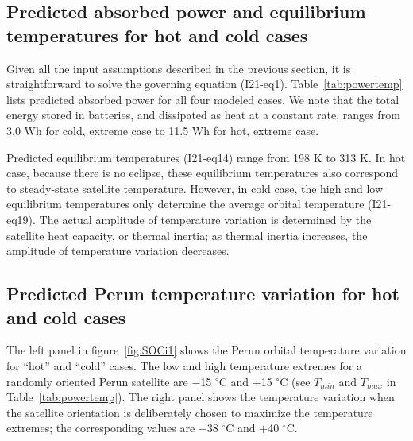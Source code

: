 \documentclass[]{aastex62}
\begin{document}
 


\subsection{Predicted absorbed power and equilibrium temperatures for hot and cold cases} 


Given all the input assumptions described in the previous section, it is straightforward to solve the
governing equation (I21-eq1). Table~\ref{tab:powertemp} lists predicted 
absorbed power for all four modeled cases.  We note that the total energy stored in batteries, and 
dissipated as heat at a constant rate, ranges from 3.0 Wh for cold, extreme case to 11.5 Wh for hot, extreme
case. 

Predicted equilibrium temperatures (I21-eq14) range from 198 K to 313 K. In hot case, because there
is no eclipse, these equilibrium temperatures also correspond to steady-state satellite temperature.
However, in cold case, the high and low equilibrium temperatures only determine the average orbital
temperature (I21-eq19). The actual amplitude of temperature variation is determined by the satellite
heat capacity, or thermal inertia; as thermal inertia increases, the amplitude of temperature variation 
decreases. 

 
\subsection{Predicted Perun temperature variation for hot and cold cases} 


The left panel in figure~\ref{fig:SOCi1} shows the Perun orbital temperature variation  for ``hot''
and ``cold'' cases. The low and high temperature extremes for a randomly oriented Perun satellite 
are $-$15 $^\circ$C and $+$15 $^\circ$C (see $T_{min}$ and $T_{max}$ in Table~\ref{tab:powertemp}). 
The right panel shows the temperature variation when the satellite orientation is deliberately chosen 
to maximize the temperature extremes; the corresponding values are $-$38 $^\circ$C and $+$40 $^\circ$C.  
 
\end{document}

